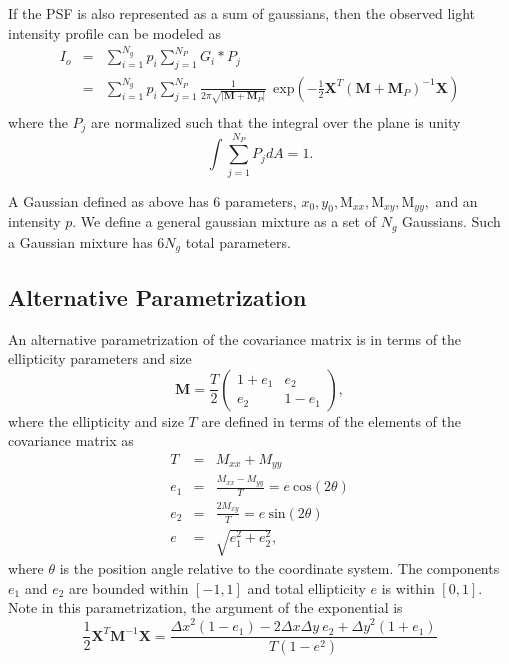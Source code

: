 \documentclass[12pt,preprint]{aastex}
\newcommand{\M}{\textbf{M}}
\newcommand{\X}{\textbf{X}}
\newcommand{\Dx}{\ensuremath{\Delta x}}
\newcommand{\Dy}{\ensuremath{\Delta y}}
\begin{document}
If the PSF is also represented as a sum of gaussians, then the observed
light intensity profile can be modeled as
\begin{eqnarray} \label{eq:postpsf}
I_o & = & \sum_{i=1}^{N_{g}} p_i \sum_{j=1}^{N_{P}} G_i * P_j \\
    & = & \sum_{i=1}^{N_{g}} p_i \sum_{j=1}^{N_{P}} \frac{1}{2 \pi \sqrt{|\M + \M_P|} } ~~ \textrm{exp}\left( -\frac{1}{2} \X^T (\M+\M_P)^{-1} \X \right) \\
\end{eqnarray}
where the $P_j$ are normalized such that the integral over
the plane is unity
\begin{equation}
\int \sum_{j=1}^{N_{P}} P_j dA = 1.
\end{equation}

A Gaussian defined as above has 6 parameters, $x_0, y_0, \textrm{M}_{xx},
\textrm{M}_{xy}, \textrm{M}_{yy},$ and an intensity $p$.  We define a general gaussian
mixture as a set of $N_g$ Gaussians.  Such a Gaussian 
mixture has $6 N_g$ total parameters.

\subsection{Alternative Parametrization}

An alternative parametrization of the covariance matrix is in
terms of the ellipticity parameters and size
\begin{equation}
\M = \frac{T}{2}\left( \begin{array}{cc}
1+e_1 & e_2 \\
e_2 & 1-e_1 \end{array} \right),
\end{equation}
where the ellipticity and size $T$ are defined in terms
of the elements of the covariance matrix as
\begin{eqnarray}
T & = & M_{xx} + M_{yy} \\
e_1 & = & \frac{M_{xx}-M_{yy}}{T}  = e ~ \textrm{cos} (2 \theta) \\
e_2 & = & \frac{2 M_{xy}}{T}  = e ~ \textrm{sin} (2 \theta) \\
e & = & \sqrt{e_1^2 + e_2^2},
\end{eqnarray}
where $\theta$ is the position angle relative to the coordinate system. 
The components 
$e_1$ and $e_2$ are bounded within
$[-1,1]$ and total ellipticity $e$ is within $[0,1]$.  Note in this
parametrization, the argument of the exponential is
\begin{equation}
\frac{1}{2} \X^T \M^{-1} \X = \frac{\Dx^2 (1-e_1) - 2 \Dx \Dy~e_2 + \Dy^2 (1+e_1)}{T (1-e^2)}
\end{equation}
\end{document}
